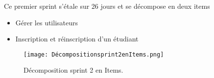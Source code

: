 \begin{fquote}
Ce premier sprint s’étale sur 26 jours et se décompose en deux items \end{fquote}
\smallskip
\begin{itemize}[label=$\diamond$]
	\item Gérer les utilisateurs
    \item  Inscription et réinscription d'un étudiant
	
\end{itemize}
\medskip
\medskip
\medskip
\medskip
\medskip
\medskip
\medskip
\medskip
\medskip
\medskip
\medskip
\begin{figure}[ht]
	\centering
	\texttt{[image: Décompositionsprint2enItems.png]}
	\caption{Décomposition sprint 2 en Items.}
	\label{fig:Décomposition sprint 2 en Items}
\end{figure}
\FloatBarrier
\clearpage




